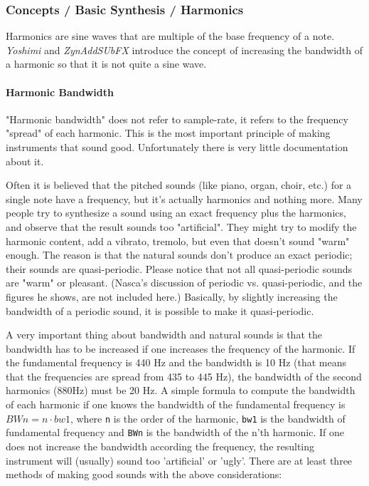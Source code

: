 \subsubsection{Concepts / Basic Synthesis / Harmonics}
\label{subsubsec:concepts_basics_harmonics}

   Harmonics are sine waves that are multiple of the base frequency of a
   note.  \textsl{Yoshimi} and \textsl{ZynAddSUbFX} introduce the concept of
   increasing the bandwidth of a harmonic so that it is not quite a sine
   wave.

\paragraph{Harmonic Bandwidth}
\label{paragraph:concepts_basics_harmonic_bandwidth}

   "Harmonic bandwidth" does not refer to sample-rate, it refers to the
   frequency "spread" of each harmonic. This is the most important principle
   of making instruments that sound good. Unfortunately there is very little
   documentation about it.
    
   Often it is believed that the pitched sounds (like piano, organ, choir,
   etc.) for a single note have a frequency, but it's actually
   harmonics and nothing more. Many people try to synthesize a sound using an
   exact frequency plus the harmonics, and observe that the result sounds too
   "artificial".  They might try to modify the harmonic content, add a
   vibrato, tremolo, but even that doesn't sound "warm" enough. The reason is
   that the natural sounds don't produce an exact periodic; their sounds are
   quasi-periodic.  Please notice that not all quasi-periodic sounds are
   "warm" or pleasant.
   (Nasca's discussion of periodic vs. quasi-periodic,
   and the figures he shows, are not included here.)
   Basically, by slightly increasing the bandwidth of a periodic sound, it
   is possible to make it quasi-periodic.

   A very important thing about bandwidth and natural sounds is that the
   bandwidth has to be increased if one increases the frequency of the
   harmonic.  If the fundamental frequency is 440 Hz and the bandwidth is 10
   Hz (that means that the frequencies are spread from 435 to 445 Hz), the
   bandwidth of the second harmonics (880Hz) must be 20 Hz. A simple formula
   to compute the bandwidth of each harmonic if one knows the bandwidth of the
   fundamental frequency is \(BWn = n⋅bw1\), where \texttt{n} is the
   order of the harmonic, \texttt{bw1} is the bandwidth of fundamental
   frequency and \texttt{BWn} is the bandwidth of the n'th harmonic. If one
   does not increase the bandwidth according the frequency, the resulting
   instrument will (usually) sound too 'artificial' or 'ugly'.  There
   are at least three methods of making good sounds with the above
   considerations: 

